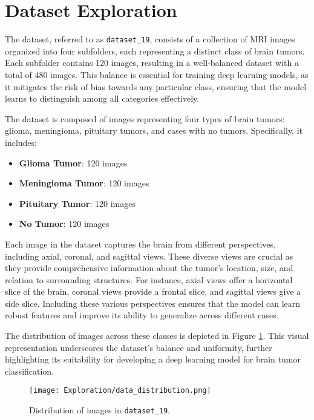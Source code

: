 \section{Dataset Exploration}\label{dataset_exploration}

The dataset, referred to as \texttt{dataset\_19}, consists of a collection of MRI images organized into four subfolders, each representing a distinct class of brain tumors. Each subfolder contains 120 images, resulting in a well-balanced dataset with a total of 480 images. This balance is essential for training deep learning models, as it mitigates the risk of bias towards any particular class, ensuring that the model learns to distinguish among all categories effectively.

The dataset is composed of images representing four types of brain tumors: glioma, meningioma, pituitary tumors, and cases with no tumors. Specifically, it includes:
\begin{itemize}
  \item \textbf{Glioma Tumor}: 120 images
  \item \textbf{Meningioma Tumor}: 120 images
  \item \textbf{Pituitary Tumor}: 120 images
  \item \textbf{No Tumor}: 120 images
\end{itemize}

Each image in the dataset captures the brain from different perspectives, including axial, coronal, and sagittal views. These diverse views are crucial as they provide comprehensive information about the tumor's location, size, and relation to surrounding structures. For instance, axial views offer a horizontal slice of the brain, coronal views provide a frontal slice, and sagittal views give a side slice. Including these various perspectives ensures that the model can learn robust features and improve its ability to generalize across different cases.

The distribution of images across these classes is depicted in Figure \ref{fig:data_distribution}. This visual representation underscores the dataset's balance and uniformity, further highlighting its suitability for developing a deep learning model for brain tumor classification.

\begin{figure}[H]
  \begin{center}
    \texttt{[image: Exploration/data\_distribution.png]}
  \end{center}
  \caption{Distribution of images in \texttt{dataset\_19}.}\label{fig:data_distribution}
\end{figure}

